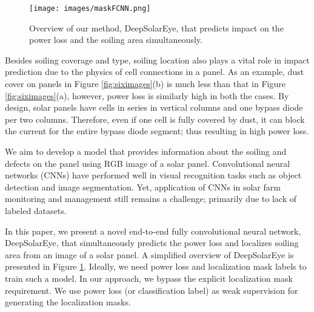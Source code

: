 \documentclass[10pt,twocolumn,letterpaper]{article}
\begin{document}
\begin{figure}[t!]
\centering
\setlength{\belowcaptionskip}{-4mm}
\texttt{[image: images/maskFCNN.png]}
\caption{Overview of our method, DeepSolarEye, that predicts impact on the power loss and the soiling area simultaneously.}
\label{fig:IMCNN_images}
\end{figure}
Besides soiling coverage and type, soiling location also plays a vital role in impact prediction due to the physics of cell connections in a panel.  As an example, dust cover on panels in Figure \ref{fig:siximages}(b) is much less than that in Figure \ref{fig:siximages}(a), however, power loss is similarly high in both the cases. %
By design, solar panels have cells in series in vertical columns and one bypass diode per two columns. Therefore, even if one cell is fully covered by dust, it can block the current for the entire bypass diode segment; thus resulting in high power loss.

We aim to develop a model that provides information about the soiling and defects on the panel using RGB image of a solar panel. Convolutional neural networks (CNNs) have performed well in visual recognition tasks such as object detection and image segmentation. Yet, application of CNNs in solar farm monitoring and management still remains a challenge; primarily due to lack of labeled datasets. 

In this paper, we present a novel end-to-end fully convolutional neural network, DeepSolarEye, that simultaneously predicts the power loss and localizes soiling area from an image of a solar panel.  A simplified overview of DeepSolarEye is presented in Figure \ref{fig:IMCNN_images}. Ideally, we need power loss and localization mask labels to train such a model. In our approach, we bypass the explicit localization mask requirement. We use power loss (or classification label) as weak supervision for generating the localization masks. 
\end{document}

